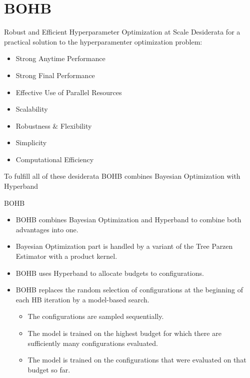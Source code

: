 \section{BOHB}
\begin{frame}[c]{Robust and Efficient Hyperparameter Optimization at Scale}
Desiderata for a practical solution to the hyperparamenter optimization problem:
\begin{itemize}
    \item Strong Anytime Performance
    \pause
    \item Strong Final Performance
    \pause
    \item Effective Use of Parallel Resources
    \pause
    \item Scalability
    \pause
    \item Robustness $\&$ Flexibility
    \pause
    \item Simplicity
    \pause
    \item Computational Efficiency
    \pause
\end{itemize}
To fulfill all of these desiderata BOHB combines Bayesian Optimization with Hyperband

\end{frame}
\begin{frame}[c]{BOHB}
\begin{itemize}
    \item BOHB combines Bayesian Optimization and Hyperband to combine both advantages into one.
    \pause
    \item Bayesian Optimization part is handled by a variant of the Tree Parzen Estimator with a product kernel.
    \pause
    \item BOHB uses Hyperband to allocate budgets to configurations.
    \pause
    \item BOHB replaces the random selection of configurations at the beginning of each HB iteration by a model-based search.
    \begin{itemize}
        \item The configurations are sampled sequentially.
        \item The model is trained on the highest budget for which there are sufficiently many configurations evaluated.
        \item The model is trained on the configurations that were evaluated on that budget so far.
    \end{itemize}
\end{itemize}

\end{frame}
